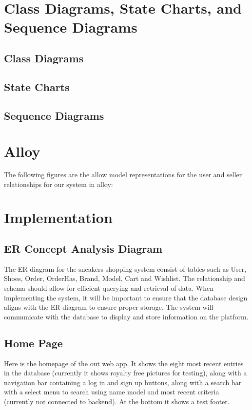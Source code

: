\section{Class Diagrams, State Charts, and Sequence Diagrams}
\subsection{Class Diagrams}
\subsection{State Charts}
\subsection{Sequence Diagrams}
\section{Alloy}
The following figures are the allow model representations for the user and seller relationships for our system in alloy:
\section{Implementation}
\subsection{ER Concept Analysis Diagram}
\hspace{1cm} The ER diagram for the sneakers shopping system consist of tables such as User, Shoes, Order,
OrderHas, Brand, Model, Cart and Wishlist. The relationship and schema should allow for efficient
querying and retrieval of data. When implementing the system, it will be important to ensure that the
database design aligns with the ER diagram to ensure proper storage. The system will communicate with
the database to display and store information on the platform.
\subsection{Home Page}
Here is the homepage of the out web app. It shows the eight most recent entries in the database (currently it shows royalty free pictures for testing), along with a navigation bar containing a log in and sign up buttons, along with a search bar with a select menu to search using name model and most recent criteria (currently not connected to backend). At the bottom it shows a test footer.

